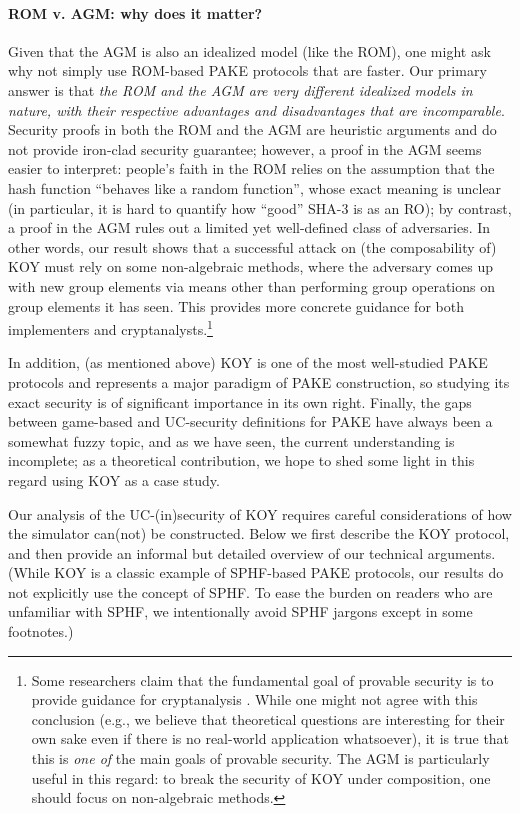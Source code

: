 \paragraph{ROM v. AGM: why does it matter?}
Given that the AGM is also an idealized model (like the ROM), one might ask why not simply use ROM-based PAKE protocols that are faster. Our primary answer is that \emph{the ROM and the AGM are very different idealized models in nature, with their respective advantages and disadvantages that are incomparable}. Security proofs in both the ROM and the AGM are heuristic arguments and do not provide iron-clad security guarantee; however, a proof in the AGM seems easier to interpret: people's faith in the ROM relies on the assumption that the hash function ``behaves like a random function'', whose exact meaning is unclear (in particular, it is hard to quantify how ``good'' SHA-3 is as an RO); by contrast, a proof in the AGM rules out a limited yet well-defined class of adversaries. In other words, our result shows that a successful attack on (the composability of) KOY must rely on some non-algebraic methods, where the adversary comes up with new group elements via means other than performing group operations on group elements it has seen. This provides more concrete guidance for both implementers and cryptanalysts.\footnote{Some researchers claim that the fundamental goal of provable security is to provide guidance for cryptanalysis \cite{provable}. While one might not agree with this conclusion (e.g., we believe that theoretical questions are interesting for their own sake even if there is no real-world application whatsoever), it is true that this is \emph{one of} the main goals of provable security. The AGM is particularly useful in this regard: to break the security of KOY under composition, one should focus on non-algebraic methods.}

In addition, (as mentioned above) KOY is one of the most well-studied PAKE protocols and represents a major paradigm of PAKE construction, so studying its exact security is of significant importance in its own right. Finally, the gaps between game-based and UC-security definitions for PAKE have always been a somewhat fuzzy topic, and as we have seen, the current understanding is incomplete; as a theoretical contribution, we hope to shed some light in this regard using KOY as a case study.

Our analysis of the UC-(in)security of KOY requires careful considerations of how the simulator can(not) be constructed. Below we first describe the KOY protocol, and then provide an informal but detailed overview of our technical arguments. (While KOY is a classic example of SPHF-based PAKE protocols, our results do not explicitly use the concept of SPHF. To ease the burden on readers who are unfamiliar with SPHF, we intentionally avoid SPHF jargons except in some footnotes.)

